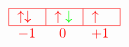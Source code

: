 \[
    \textcolor{red}{
        \begin{array}{c}
            \begin{tabular}{|m{0.5cm}|m{0.5cm}|m{0.5cm}|}
                \hline
                $\uparrow \downarrow$ & $\uparrow \textcolor{green}{\downarrow}$ & $\uparrow$ \\
                \hline
            \end{tabular} \\ 
            \begin{tabular}{m{0.5cm} m{0.5cm} m{0.5cm}}
                $-1$ & \text{ 0 } & $+1$
            \end{tabular}
        \end{array}
    }
\]